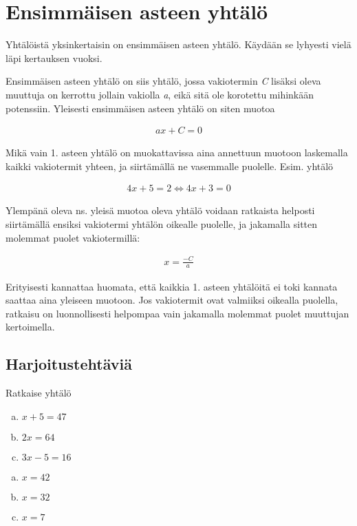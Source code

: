 \chapter{Ensimmäisen asteen yhtälö}

Yhtälöistä yksinkertaisin on ensimmäisen asteen yhtälö. Käydään se lyhyesti
vielä läpi kertauksen vuoksi.

Ensimmäisen asteen yhtälö on siis yhtälö, jossa vakiotermin \emph{C} lisäksi
oleva muuttuja on kerrottu jollain vakiolla \emph{a}, eikä sitä ole korotettu
mihinkään potenssiin. Yleisesti ensimmäisen asteen yhtälö on siten muotoa

\begin{align*}
    ax + C = 0
\end{align*}

Mikä vain 1. asteen yhtälö on muokattavissa aina
annettuun muotoon laskemalla kaikki vakiotermit yhteen,
ja siirtämällä ne vasemmalle puolelle. Esim. yhtälö

\begin{align*}
    4x + 5 = 2 \Leftrightarrow 4x + 3 = 0
\end{align*}

Ylempänä oleva ns. yleisä muotoa oleva yhtälö voidaan ratkaista helposti siirtämällä
ensiksi vakiotermi yhtälön oikealle puolelle, ja jakamalla sitten molemmat puolet vakiotermillä:

\begin{align*}
    x = \frac{-C}{a}
\end{align*}

Erityisesti kannattaa huomata, että kaikkia 1. asteen yhtälöitä ei toki
kannata saattaa aina yleiseen muotoon. Jos vakiotermit ovat valmiiksi oikealla
puolella, ratkaisu on luonnollisesti helpompaa vain jakamalla molemmat puolet
muuttujan kertoimella.

\section{Harjoitustehtäviä}

\begin{tehtava}
  Ratkaise yhtälö
  \begin{enumerate}[a)]
    \item $x + 5 = 47$
    \item $2x = 64$
    \item $3x - 5 = 16$
  \end{enumerate}

  \begin{vastaus}
    \begin{enumerate}[a)]
      \item $x = 42$
      \item $x = 32$
      \item $x = 7$
    \end{enumerate}
  \end{vastaus}
\end{tehtava}

